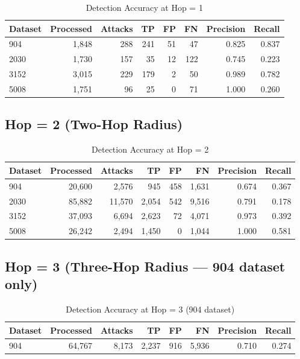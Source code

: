 \documentclass[11pt,a4paper]{article}
\begin{document}
\begin{table}[H]
\centering
\caption{Detection Accuracy at Hop = 1}
\begin{tabular}{lrrrrrrr}
\toprule
\textbf{Dataset} & \textbf{Processed} & \textbf{Attacks} & \textbf{TP} & \textbf{FP} & \textbf{FN} & \textbf{Precision} & \textbf{Recall} \\
\midrule
904   & 1,848  & 288  & 241 & 51  & 47  & 0.825 & 0.837 \\
2030  & 1,730  & 157  & 35  & 12  & 122 & 0.745 & 0.223 \\
3152  & 3,015  & 229  & 179 & 2   & 50  & 0.989 & 0.782 \\
5008  & 1,751  & 96   & 25  & 0   & 71  & 1.000 & 0.260 \\
\bottomrule
\end{tabular}
\end{table}

\subsection{Hop = 2 (Two-Hop Radius)}

\begin{table}[H]
\centering
\caption{Detection Accuracy at Hop = 2}
\begin{tabular}{lrrrrrrr}
\toprule
\textbf{Dataset} & \textbf{Processed} & \textbf{Attacks} & \textbf{TP} & \textbf{FP} & \textbf{FN} & \textbf{Precision} & \textbf{Recall} \\
\midrule
904   & 20,600  & 2,576  & 945   & 458 & 1,631 & 0.674 & 0.367 \\
2030  & 85,882  & 11,570 & 2,054 & 542 & 9,516 & 0.791 & 0.178 \\
3152  & 37,093  & 6,694  & 2,623 & 72  & 4,071 & 0.973 & 0.392 \\
5008  & 26,242  & 2,494  & 1,450 & 0   & 1,044 & 1.000 & 0.581 \\
\bottomrule
\end{tabular}
\end{table}

\subsection{Hop = 3 (Three-Hop Radius --- 904 dataset only)}

\begin{table}[H]
\centering
\caption{Detection Accuracy at Hop = 3 (904 dataset)}
\begin{tabular}{lrrrrrrr}
\toprule
\textbf{Dataset} & \textbf{Processed} & \textbf{Attacks} & \textbf{TP} & \textbf{FP} & \textbf{FN} & \textbf{Precision} & \textbf{Recall} \\
\midrule
904   & 64,767  & 8,173  & 2,237 & 916 & 5,936 & 0.710 & 0.274 \\
\bottomrule
\end{tabular}
\end{table}
\end{document}
